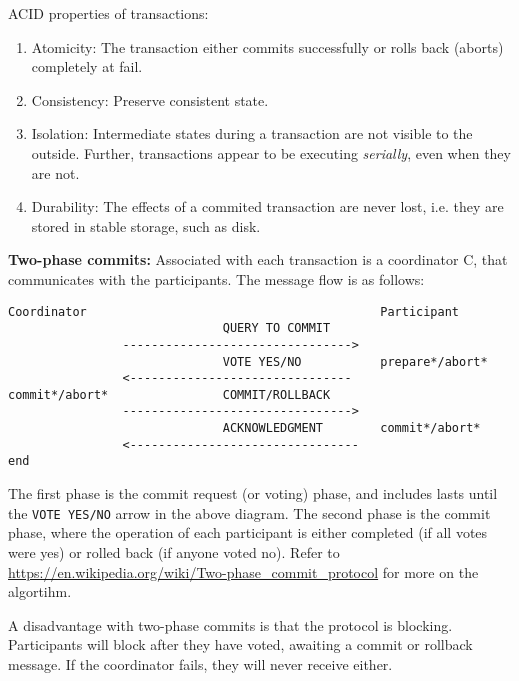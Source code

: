 ACID properties of transactions:
\begin{enumerate}
    \item Atomicity: The transaction either commits successfully or rolls back (aborts) completely at fail.
    \item Consistency: Preserve consistent state.
    \item Isolation: Intermediate states during a transaction are not visible to the outside. Further, transactions appear to be executing \emph{serially}, even when they are not.
    \item Durability: The effects of a commited transaction are never lost, i.e. they are stored in stable storage, such as disk.
\end{enumerate}
\textbf{Two-phase commits:}
Associated with each transaction is a coordinator C, that communicates with the participants. The message flow is as follows:
\begin{verbatim}
Coordinator                                         Participant
                              QUERY TO COMMIT
                -------------------------------->
                              VOTE YES/NO           prepare*/abort*
                <-------------------------------
commit*/abort*                COMMIT/ROLLBACK
                -------------------------------->
                              ACKNOWLEDGMENT        commit*/abort*
                <--------------------------------  
end
\end{verbatim}
The first phase is the commit request (or voting) phase, and includes lasts until the \texttt{VOTE YES/NO} arrow in the above diagram. The second phase is the commit phase, where the operation of each participant is either completed (if all votes were yes) or rolled back (if anyone voted no). Refer to \url{https://en.wikipedia.org/wiki/Two-phase_commit_protocol} for more on the algortihm.

A disadvantage with two-phase commits is that the protocol is blocking. Participants will block after they have voted, awaiting a commit or rollback message. If the coordinator fails, they will never receive either.






